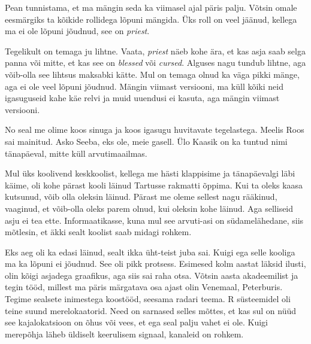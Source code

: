 Pean tunnistama, et ma mängin seda ka viimasel ajal päris palju. Võtsin omale 
eesmärgiks ta kõikide rollidega lõpuni mängida. Üks roll on veel jäänud, 
kellega ma ei ole lõpuni jõudnud, see on 
\emph{priest}.

Tegelikult on temaga ju lihtne. Vaata, \emph{priest} näeb kohe ära, et kas asja 
saab selga panna või mitte, et kas see on \emph{blessed} või \emph{cursed}. 
Alguses nagu tundub lihtne, aga võib-olla see lihtsus  maksabki kätte. Mul on 
temaga olnud ka väga pikki mänge, aga ei ole veel lõpuni jõudnud. Mängin 
viimast versiooni, ma küll kõiki neid igasuguseid kahe käe relvi ja muid 
uuendusi ei kasuta, aga mängin viimast versiooni.


No seal me olime koos sinuga ja koos igasugu huvitavate tegelastega. Meelis 
Roos sai mainitud. Asko Seeba, eks ole, meie 
gasell. Ülo 
Kaasik on ka tuntud nimi tänapäeval, mitte küll 
arvutimaailmas.


Mul üks koolivend keskkoolist, kellega me hästi klappisime ja tänapäevalgi läbi 
käime, oli kohe pärast kooli läinud Tartusse rakmatti õppima. Kui ta oleks 
kaasa kutsunud, võib olla oleksin läinud. Pärast me oleme sellest nagu 
rääkinud, vaaginud, et võib-olla oleks parem olnud, kui oleksin kohe läinud. 
Aga selliseid asju ei tea ette. Informaatikasse, kuna mul see arvuti-asi on  
südamelähedane, siis mõtlesin, et äkki sealt koolist saab midagi rohkem. 


Eks aeg oli ka edasi läinud, sealt ikka üht-teist juba sai. Kuigi ega selle 
kooliga ma ka lõpuni ei jõudnud. See oli pikk protsess. Esimesed kolm aastat 
läksid ilusti, olin kõigi asjadega  graafikus, aga siis sai raha otsa. Võtsin 
aasta akadeemilist ja tegin tööd, millest ma päris märgatava osa ajast olin 
Venemaal, Peterburis. Tegime sealsete inimestega koostööd, seesama radari 
teema. R süsteemidel oli teine suund merelokaatorid. Need on sarnased selles 
mõttes, et kas sul on nüüd see kajalokatsioon on õhus või vees, et ega seal 
palju vahet ei ole. Kuigi merepõhja läheb üldiselt keerulisem signaal, kanaleid 
on rohkem.

